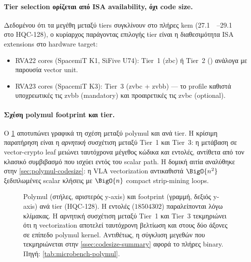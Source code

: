 \paragraph{Tier selection ορίζεται από ISA availability, όχι code size.}
Δεδομένου ότι τα μεγέθη μεταξύ tiers συγκλίνουν στο πλήρες \gls{kem}
(\SIrange{27.1}{29.1}{\kilo\byte} στο HQC-128), ο κυρίαρχος παράγοντας
επιλογής tier είναι η διαθεσιμότητα ISA extensions στο hardware target:
\begin{itemize}
  \item RVA22 cores (SpacemiT K1, SiFive U74): Tier~1 (\gls{zbc}) ή Tier~2
    (\RVV) ανάλογα με παρουσία vector unit.
  \item RVA23 cores (SpacemiT K3): Tier~3 (\gls{zvbc} + \gls{zvbb}) — το
    profile καθιστά υποχρεωτικές τις \gls{zvbb} (mandatory) και προαιρετικές
    τις \gls{zvbc} (optional).
\end{itemize}

\paragraph{Σχέση polymul footprint και tier.}
Ο \cref{fig:code-size-dual-axis} αποτυπώνει γραφικά τη σχέση μεταξύ
polymul  και \instret ανά tier. Η κρίσιμη παρατήρηση
είναι η \emph{αρνητική} συσχέτιση μεταξύ Tier~1 και Tier~3: η
μετάβαση σε vector-crypto leaf μειώνει ταυτόχρονα μέγεθος κώδικα
\emph{και} εντολές, αντίθετα από τον κλασικό συμβιβασμό
 που ισχύει εντός του scalar
path. Η δομική αιτία αναλύθηκε στην \cref{sec:polymul-codesize}:
η VLA vectorization αντικαθιστά $\BigO{n^2}$ ξεδιπλωμένες scalar
κλήσεις με $\BigO{n}$ compact strip-mining loops.

\begin{figure}[htbp]
  \centering
  
  \caption{Polymul \instret (στήλες, αριστερός y-axis) και 
    footprint (γραμμή, δεξιός y-axis) ανά tier (HQC-128). Η
     εντολές ($\num{18504302}$) παραλείπονται λόγω
    κλίμακας. Η αρνητική συσχέτιση μεταξύ Tier~1 και Tier~3
    τεκμηριώνει ότι η vectorization αποτελεί ταυτόχρονη βελτίωση
    και στους δύο άξονες σε επίπεδο polymul kernel. Αντιθέτως, η σύγκλιση μεγεθών που τεκμηριώνεται στην \cref{ssec:codesize-summary} αφορά το πλήρες \KEM binary. Πηγή: \cref{tab:microbench-polymul}.}
  \label{fig:code-size-dual-axis}
\end{figure}

